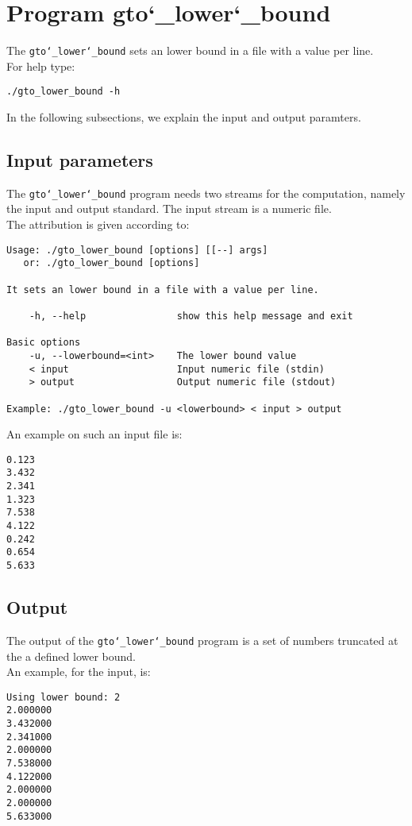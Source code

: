 \section{Program gto\char`_lower\char`_bound}
The \texttt{gto\char`_lower\char`_bound} sets an lower bound in a file with a value per line.\\
For help type:
\begin{lstlisting}
./gto_lower_bound -h
\end{lstlisting}
In the following subsections, we explain the input and output paramters.

\subsection*{Input parameters}

The \texttt{gto\char`_lower\char`_bound} program needs two streams for the computation,
namely the input and output standard. The input stream is a numeric file.\\
The attribution is given according to:
\begin{lstlisting}
Usage: ./gto_lower_bound [options] [[--] args]
   or: ./gto_lower_bound [options]

It sets an lower bound in a file with a value per line.

    -h, --help                show this help message and exit

Basic options
    -u, --lowerbound=<int>    The lower bound value
    < input                   Input numeric file (stdin)
    > output                  Output numeric file (stdout)

Example: ./gto_lower_bound -u <lowerbound> < input > output
\end{lstlisting}
An example on such an input file is:
\begin{lstlisting}
0.123
3.432
2.341
1.323
7.538
4.122
0.242
0.654
5.633
\end{lstlisting}

\subsection*{Output}
The output of the \texttt{gto\char`_lower\char`_bound} program is a set of numbers truncated at the a defined lower bound.\\
An example, for the input, is:
\begin{lstlisting}
Using lower bound: 2
2.000000
3.432000
2.341000
2.000000
7.538000
4.122000
2.000000
2.000000
5.633000
\end{lstlisting}